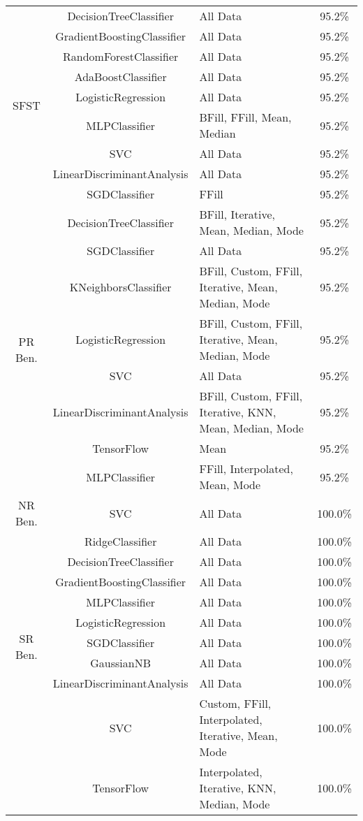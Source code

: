 \begin{table}[H]
\begin{tabular}{|c|c|p{4cm}|c|}
\multirow{9}{*}{SFST} & DecisionTreeClassifier & All Data & 95.2\% \\
 & GradientBoostingClassifier & All Data & 95.2\% \\
 & RandomForestClassifier & All Data & 95.2\% \\
 & AdaBoostClassifier & All Data & 95.2\% \\
 & LogisticRegression & All Data & 95.2\% \\
 & MLPClassifier & BFill, FFill, Mean, Median & 95.2\% \\
 & SVC & All Data & 95.2\% \\
 & LinearDiscriminantAnalysis & All Data & 95.2\% \\
 & SGDClassifier & FFill & 95.2\% \\
\hline

\multirow{8}{*}{PR Ben.} & DecisionTreeClassifier & BFill, Iterative, Mean, Median, Mode & 95.2\% \\
 & SGDClassifier & All Data & 95.2\% \\
 & KNeighborsClassifier & BFill, Custom, FFill, Iterative, Mean, Median, Mode & 95.2\% \\
 & LogisticRegression & BFill, Custom, FFill, Iterative, Mean, Median, Mode & 95.2\% \\
 & SVC & All Data & 95.2\% \\
 & LinearDiscriminantAnalysis & BFill, Custom, FFill, Iterative, KNN, Mean, Median, Mode & 95.2\% \\
 & TensorFlow & Mean & 95.2\% \\
 & MLPClassifier & FFill, Interpolated, Mean, Mode & 95.2\% \\
\hline

NR Ben. & SVC & All Data & 100.0\% \\
\hline

\multirow{9}{*}{SR Ben.} & RidgeClassifier & All Data & 100.0\% \\
 & DecisionTreeClassifier & All Data & 100.0\% \\
 & GradientBoostingClassifier & All Data & 100.0\% \\
 & MLPClassifier & All Data & 100.0\% \\
 & LogisticRegression & All Data & 100.0\% \\
 & SGDClassifier & All Data & 100.0\% \\
 & GaussianNB & All Data & 100.0\% \\
 & LinearDiscriminantAnalysis & All Data & 100.0\% \\
 & SVC & Custom, FFill, Interpolated, Iterative, Mean, Mode & 100.0\% \\
 & TensorFlow & Interpolated, Iterative, KNN, Median, Mode & 100.0\% \\
\hline


\end{tabular}
\end{table}
